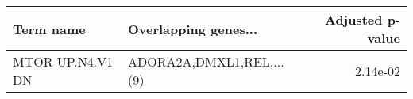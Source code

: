 \begin{tabular}{llr}
\toprule
       Term name &     Overlapping genes... &  Adjusted p-value \\
\midrule
MTOR UP.N4.V1 DN & ADORA2A,DMXL1,REL,...(9) &          2.14e-02 \\
\bottomrule
\end{tabular}
